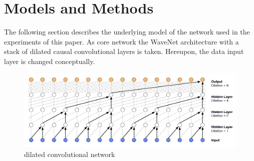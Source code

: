 \documentclass[10pt,conference,compsocconf]{IEEEtran}
\begin{document}
\section{Models and Methods}
The following section describes the underlying model of the network used in the experiments of this paper. As core network the WaveNet architecture with a stack of dilated causal convolutional layers is taken. Hereupon, the data input layer is changed conceptually.
\begin{figure}[tbp]
	\centering
	\includegraphics[width=\columnwidth]{figures/wavenet_dilated_cnn.png}
	\caption{dilated convolutional network}
	\label{fig:wavenet_dilated_cnn}
\end{figure}
\end{document}
